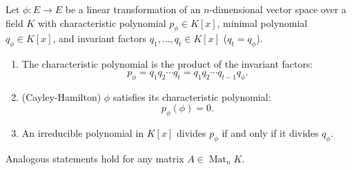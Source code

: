 Let $\phi : E \to E$ be a linear transformation of an $n$-dimensional vector space over a field $K$ with characteristic polynomial $p_{\phi} \in K[x]$, minimal polynomial $q_{\phi} \in K[x]$, and invariant factors $q_1, \ldots, q_t \in K[x]$ ($q_t = q_\phi$).
\begin{enumerate}
\item The characteristic polynomial is the product of the invariant factors:
\[
p_{\phi} = q_1 q_2 \cdots q_t = q_1 q_2 \cdots q_{t-1} q_{\phi}.
\]
\item (Cayley-Hamilton) $\phi$ satisfies its characteristic polynomial:
\[
p_{\phi}(\phi) = 0.
\]
\item An irreducible polynomial in $K[x]$ divides $p_{\phi}$ if and only if it divides $q_{\phi}$.
\end{enumerate}
Analogous statements hold for any matrix $A \in \operatorname{Mat}_n K$.
